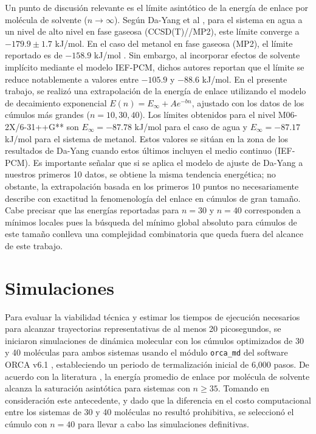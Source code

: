 Un punto de discusión relevante es el límite asintótico de la energía de enlace por molécula de solvente ($n \to \infty$). Según Da-Yang et al \cite{Wa-2024-03}, para el sistema en agua a un nivel de alto nivel en fase gaseosa (CCSD(T)//MP2), este límite converge a $-179.9 \pm 1.7$ kJ/mol. En el caso del metanol en fase gaseosa (MP2), el límite reportado es de $-158.9$ kJ/mol \cite{Me-2022-01}. Sin embargo, al incorporar efectos de solvente implícito mediante el modelo IEF-PCM, dichos autores reportan que el límite se reduce notablemente a valores entre $-105.9$ y $-88.6$ kJ/mol. En el presente trabajo, se realizó una extrapolación de la energía de enlace utilizando el modelo de decaimiento exponencial $E(n) = E_\infty + A e^{-bn}$, ajustado con los datos de los cúmulos más grandes ($n=10, 30, 40$). Los límites obtenidos para el nivel M06-2X/6-31++G** son $E_\infty = -87.78$ kJ/mol para el caso de agua y $E_\infty = -87.17$ kJ/mol para el sistema de metanol. Estos valores se sitúan en la zona de los resultados de Da-Yang cuando estos últimos incluyen el medio continuo (IEF-PCM). Es importante señalar que si se aplica el modelo de ajuste de Da-Yang a nuestros primeros 10 datos, se obtiene la misma tendencia energética; no obstante, la extrapolación basada en los primeros 10 puntos no necesariamente describe con exactitud la fenomenología del enlace en cúmulos de gran tamaño. Cabe precisar que las energías reportadas para $n=30$ y $n=40$ corresponden a mínimos locales pues la búsqueda del mínimo global absoluto para cúmulos de este tamaño conlleva una complejidad combinatoria que queda fuera del alcance de este trabajo.

\section{Simulaciones}

Para evaluar la viabilidad técnica y estimar los tiempos de ejecución necesarios para alcanzar trayectorias representativas de al menos 20 picosegundos, se iniciaron simulaciones de dinámica molecular con los cúmulos optimizados de 30 y 40 moléculas para ambos sistemas usando el módulo \texttt{orca\_md} del software ORCA v6.1 \cite{orca, orca6.1}, estableciendo un periodo de termalización inicial de 6,000 pasos. De acuerdo con la literatura \cite{Me-2023-01}, la energía promedio de enlace por molécula de solvente alcanza la saturación asintótica para sistemas con $n \geq 35$. Tomando en consideración este antecedente, y dado que la diferencia en el costo computacional entre los sistemas de 30 y 40 moléculas no resultó prohibitiva, se seleccionó el cúmulo con $n = 40$ para llevar a cabo las simulaciones definitivas.

